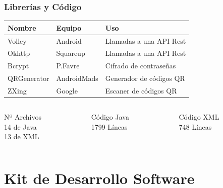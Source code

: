 \documentclass[usenames,dvipsnames]{beamer}
\begin{document}
\begin{frame} 
\frametitle{Librerías y Código} 
  \begin{tabular}{|l|l|m{14em}|}
    \hline
    \textbf{\textcolor{UniGold}{Nombre}} & 
    \textbf{\textcolor{UniGold}{Equipo}} & 
    \textbf{\textcolor{UniGold}{Uso}} \\
    \hline
    Volley & Android & Llamadas a una API Rest \\
    \hline
    Okhttp & Squareup & Llamadas a una API Rest \\
    \hline
    Bcrypt & P.Favre & Cifrado de contraseñas \\
    \hline
    QRGenerator & AndroidMads & Generador de códigos QR \\
    \hline
    ZXing & Google & Escaner de códigos QR \\
    \hline
  \end{tabular}

  \begin{columns}
  \begin{column}{0.33\textwidth}
    \begin{center}
      \textcolor{UniGold}{Nº Archivos} \\
      14 de Java \\
      13 de XML
    \end{center}
  \end{column}
  \begin{column}{0.33\textwidth}
    \begin{center}
      \textcolor{UniGold}{Código Java} \\
      1799 Líneas
    \end{center}
  \end{column}
  \begin{column}{0.33\textwidth}
    \begin{center}
      \textcolor{UniGold}{Código XML} \\
      748 Líneas
    \end{center}
  \end{column}
  \end{columns}
\end{frame}


\section{Kit de Desarrollo Software}
\end{document}
